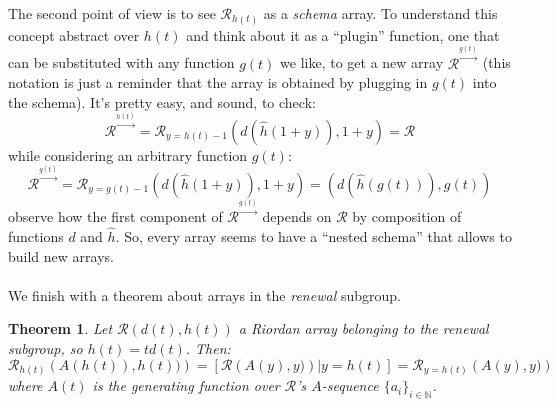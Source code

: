 \documentclass[11pt,a4paper]{article} %
\newtheorem{theorem}{Theorem}[section]
\begin{document}
    The second point of view is to see $\mathcal{R}_{h(t)}$ as a \emph{schema} array.
    To understand this concept abstract over $h(t)$ and think about it as a ``plugin''
    function, one that can be substituted with any function $g(t)$ we like, to get a new array
    $\mathcal{R}^{\stackrel{g(t)}{\rightarrow}}$ (this notation is just a reminder that the array is obtained
    by plugging in $g(t)$ into the schema). It's pretty easy, and sound, to check:
    \begin{displaymath}
        \mathcal{R}^{\stackrel{h(t)}{\rightarrow}} = \mathcal{R}_{y=h(t)-1}\left( d(\hat{h}(1+y)), 1+y \right) = \mathcal{R}
    \end{displaymath}
    while considering an arbitrary function $g(t)$:
    \begin{displaymath}
        \mathcal{R}^{\stackrel{g(t)}{\rightarrow}} = \mathcal{R}_{y=g(t)-1}\left( d(\hat{h}(1+y)), 1+y \right) = 
        \left( d(\hat{h}(g(t))), g(t) \right) 
    \end{displaymath}
    observe how the first component of $\mathcal{R}^{\stackrel{g(t)}{\rightarrow}}$ depends on
    $\mathcal{R}$ by composition of functions $d$ and $\hat{h}$. So, every array seems to have
    a ``nested schema'' that allows to build new arrays.
    \\\\
    We finish with a theorem about arrays in the \emph{renewal} subgroup.

    \begin{theorem}
        Let $\mathcal{R}\left(d(t), h(t)\right)$ a Riordan array belonging
        to the \emph{renewal} subgroup, so $h(t)=td(t)$. Then:
        \begin{displaymath}
            \mathcal{R}_{h(t)}\left(A(h(t)), h(t))\right)=
            \left[\left.\mathcal{R}\left(A(y), y)\right)\right|y=h(t)\right] =
            \mathcal{R}_{y=h(t)}\left(A(y), y)\right)
        \end{displaymath}
        where $A(t)$ is the generating function over $\mathcal{R}$'s $A$-sequence 
        $\lbrace a_i \rbrace_{i\in\mathbb{N}}$. 
    \end{theorem}
\end{document}
